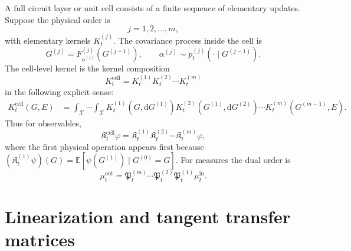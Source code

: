 \documentclass[aps,preprint,onecolumn,nofootinbib,superscriptaddress]{revtex4-2}
\newcommand{\E}{\mathbb{E}}
\newcommand{\dd}{\mathrm{d}}
\newcommand{\cX}{\mathcal{X}}
\newcommand{\PF}{\mathfrak{P}}
\newcommand{\Koop}{\mathfrak{K}}
\theoremstyle{definition}
\theoremstyle{plain}
\begin{document}
A full circuit layer or unit cell consists of a finite sequence of elementary
updates. Suppose the physical order is
\begin{equation}
  j=1,2,\ldots,m,
\end{equation}
with elementary kernels \(K_t^{(j)}\). The covariance process inside the cell is
\begin{equation}
  G^{(j)}=F_{\alpha^{(j)}}^{(j)}(G^{(j-1)}),
  \qquad
  \alpha^{(j)}\sim p_t^{(j)}(\cdot\mid G^{(j-1)}).
\end{equation}
The cell-level kernel is the kernel composition
\begin{equation}
  K_t^{\mathrm{cell}}
  =
  K_t^{(1)}K_t^{(2)}\cdots K_t^{(m)}
\end{equation}
in the following explicit sense:
\begin{align}
  K_t^{\mathrm{cell}}(G,E)
  &=
  \int_{\cX}\cdots\int_{\cX}
  K_t^{(1)}(G,\dd G^{(1)})
  K_t^{(2)}(G^{(1)},\dd G^{(2)})
  \cdots
  K_t^{(m)}(G^{(m-1)},E).
  \label{eq:kernel-composition}
\end{align}
Thus for observables,
\begin{equation}
  \Koop_t^{\mathrm{cell}}\varphi
  =
  \Koop_t^{(1)}
  \Koop_t^{(2)}
  \cdots
  \Koop_t^{(m)}
  \varphi,
  \label{eq:observable-composition}
\end{equation}
where the first physical operation appears first because
\((\Koop_t^{(1)}\psi)(G)=\E[\psi(G^{(1)})\mid G^{(0)}=G]\). For measures the
dual order is
\begin{equation}
  \mu_t^{\mathrm{out}}
  =
  \PF_t^{(m)}
  \cdots
  \PF_t^{(2)}
  \PF_t^{(1)}
  \mu_t^{\mathrm{in}}.
  \label{eq:measure-composition}
\end{equation}

\section{Linearization and tangent transfer matrices}
\end{document}
